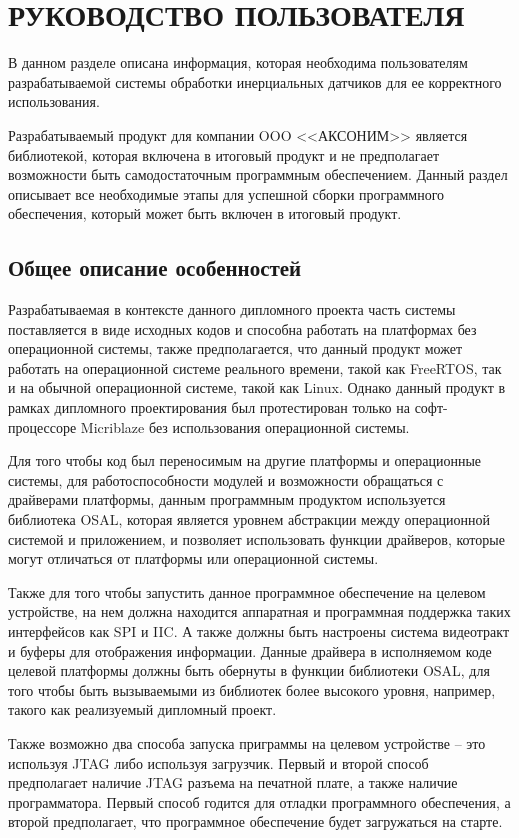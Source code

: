 \section{РУКОВОДСТВО ПОЛЬЗОВАТЕЛЯ}
\label{sec:manual}

В данном разделе описана информация, которая необходима пользователям
разрабатываемой системы обработки инерциальных датчиков для ее корректного использования.

Разрабатываемый продукт для компании OOO <<АКСОНИМ>> является библиотекой, которая включена
в итоговый продукт и не предполагает возможности быть самодостаточным программным обеспечением.
Данный раздел описывает все необходимые этапы для успешной сборки программного обеспечения, который может быть включен
в итоговый продукт.

\subsection{Общее описание особенностей}

Разрабатываемая в контексте данного дипломного проекта
часть системы поставляется в виде исходных кодов и способна работать
на платформах без операционной системы, также предполагается, что данный продукт может работать
на операционной системе реального времени, такой как FreeRTOS, так и
на обычной операционной системе, такой как Linux. Однако данный продукт в рамках дипломного проектирования был
протестирован только на софт-процессоре Micriblaze без использования операционной системы.

Для того чтобы код был переносимым на другие платформы и операционные системы, для работоспособности модулей
и возможности обращаться с драйверами платформы, данным программным продуктом используется библиотека OSAL, которая
является уровнем абстракции между операционной системой и приложением, и позволяет использовать функции драйверов, которые
могут отличаться от платформы или операционной системы.

Также для того чтобы запустить данное программное обеспечение на целевом устройстве, на нем должна находится аппаратная и программная поддержка таких интерфейсов
как SPI и IIC. А также должны быть настроены система видеотракт и буферы для отображения информации. Данные драйвера в исполняемом коде целевой платформы должны быть
обернуты в функции библиотеки OSAL, для того чтобы быть вызываемыми из библиотек более высокого уровня, например, такого как реализуемый дипломный проект.

Также возможно два способа запуска приграммы на целевом устройстве -- это используя JTAG либо используя загрузчик. Первый и второй способ предполагает наличие JTAG
разъема на печатной плате, а также наличие программатора. Первый способ годится для отладки программного обеспечения, а второй предполагает, что программное обеспечение
будет загружаться на старте.


